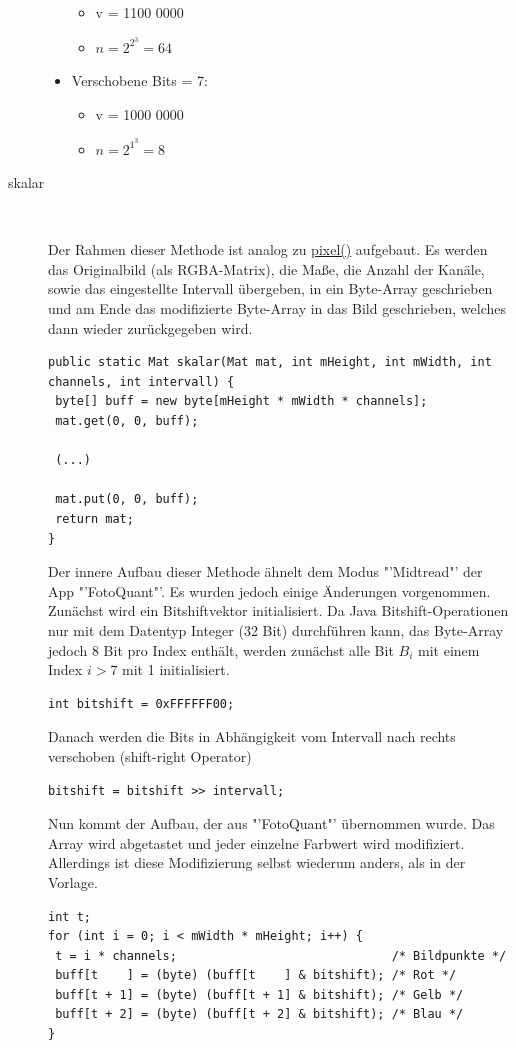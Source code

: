 \begin{description}
\begin{itemize}
\begin{itemize}
\item v = 1100 0000
\item \( n = 2^{2^3} =       64 \) 
\end{itemize}  
\item Verschobene Bits = 7:
\begin{itemize}
\item v = 1000 0000
\item \( n = 2^{1^3} =        8 \) 
\end{itemize}    
\end{itemize}
\item[skalar]~\par
\label{skalar}
Der Rahmen dieser Methode ist analog zu \hyperref[pixel]{pixel()} aufgebaut. Es werden das Originalbild (als RGBA-Matrix), die Maße, die Anzahl der Kanäle, sowie das eingestellte Intervall übergeben, in ein Byte-Array geschrieben und am Ende das modifizierte Byte-Array in das Bild geschrieben, welches dann wieder zurückgegeben wird.
\begin{lstlisting}
public static Mat skalar(Mat mat, int mHeight, int mWidth, int channels, int intervall) {
 byte[] buff = new byte[mHeight * mWidth * channels]; 
 mat.get(0, 0, buff);                                 
 
 (...) 
 
 mat.put(0, 0, buff);                                			
 return mat;                                          			
}
\end{lstlisting}

Der innere Aufbau dieser Methode ähnelt dem Modus "'Midtread"' der App "'FotoQuant"'. Es wurden jedoch einige Änderungen vorgenommen.\\
Zunächst wird ein Bitshiftvektor initialisiert. Da Java Bitshift-Operationen nur mit dem Datentyp \textcolor{blau}{Integer} (32 Bit) durchführen kann, das Byte-Array jedoch 8 Bit pro Index enthält, werden zunächst alle Bit \(B_i\) mit einem Index \(i>7\) mit \textcolor{blau}{1} initialisiert.
\begin{lstlisting}
int bitshift = 0xFFFFFF00;
\end{lstlisting} 
Danach werden die Bits in Abhängigkeit vom Intervall nach rechts verschoben (shift-right Operator)
\begin{lstlisting}
bitshift = bitshift >> intervall;
\end{lstlisting} 
Nun kommt der Aufbau, der aus "'FotoQuant"' übernommen wurde. Das Array wird abgetastet und jeder einzelne Farbwert wird modifiziert. Allerdings ist diese Modifizierung selbst wiederum anders, als in der Vorlage.
\begin{lstlisting}
int t;
for (int i = 0; i < mWidth * mHeight; i++) {
 t = i * channels;                              /* Bildpunkte */
 buff[t    ] = (byte) (buff[t    ] & bitshift); /* Rot */
 buff[t + 1] = (byte) (buff[t + 1] & bitshift); /* Gelb */
 buff[t + 2] = (byte) (buff[t + 2] & bitshift); /* Blau */
}
\end{lstlisting} 


\end{description}


